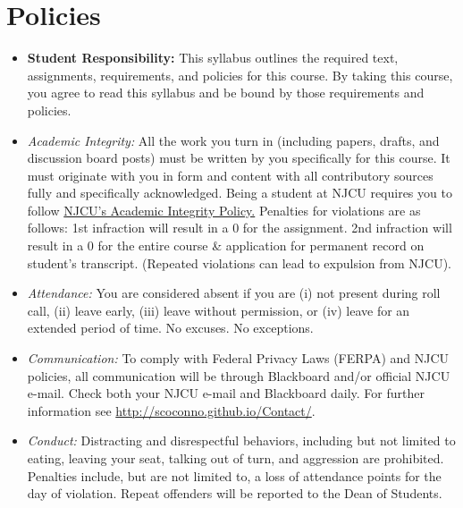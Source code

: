 \documentclass[article,oneside]{memoir}
\begin{document}
\section{Policies}

\begin{itemize}

\item \textbf{Student Responsibility:} This syllabus outlines the required text, assignments, requirements, and policies for this course. By taking this course, you agree to read this syllabus and be bound by those requirements and policies. 

 \item \textit{Academic Integrity:} All the work you turn in (including papers, drafts, and discussion board posts) must be written by you specifically for this course. It must originate with you in form and content with all contributory sources fully and specifically acknowledged. Being a student at NJCU requires you to follow \href{http://www.njcu.edu/uploadedFiles/About_NJCU/Governance_and_Organization/University_Senate/Policies/Academic\%20INTEGRITY\%20POLICY\%20FINAL\%202-04.pdf}{NJCU's Academic Integrity Policy.} Penalties for violations are as follows: 1st infraction will result in a 0 for the assignment.  2nd infraction will result in a 0 for the entire course \& application for permanent record on student's transcript. (Repeated violations can lead to expulsion from NJCU). 

\item \textit{Attendance:} You are considered absent if you are (i) not present during roll call, (ii) leave early, (iii) leave without permission, or (iv) leave for an extended period of time. No excuses. No exceptions.



\item \textit{Communication:} To comply with Federal Privacy Laws (FERPA) and NJCU policies, all communication will be through Blackboard and/or official NJCU e-mail. Check both your NJCU e-mail and Blackboard daily. For further information see \href{http://scoconno.github.io/Contact/}{http://scoconno.github.io/Contact/}.

\item \textit{Conduct:} Distracting and disrespectful behaviors, including but not limited to eating, leaving your seat, talking out of turn, and aggression are prohibited. Penalties include, but are not limited to, a loss of attendance points for the day of violation. Repeat offenders will be reported to the Dean of Students. 


\end{itemize}
\end{document}
